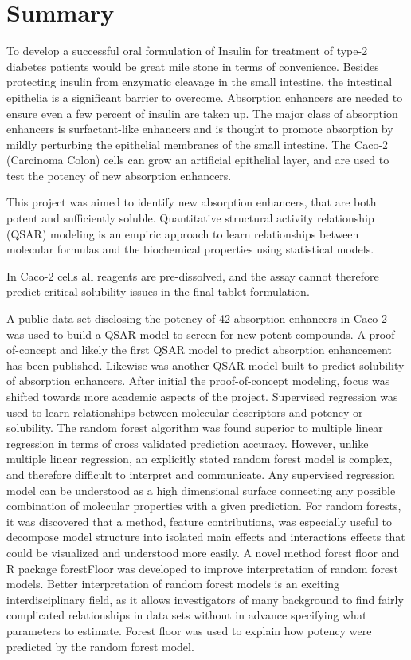 \chapter{Summary}
To develop a successful oral formulation of Insulin for treatment of type-2 diabetes patients would be great mile stone in terms of convenience. Besides protecting insulin from enzymatic cleavage in the small intestine, the intestinal epithelia is a significant barrier to overcome. Absorption enhancers are needed to ensure even a few percent of insulin are taken up. The major class of absorption enhancers is surfactant-like enhancers and is thought to promote absorption by mildly perturbing the epithelial membranes of the small intestine. The Caco-2 (Carcinoma Colon) cells can grow an artificial epithelial layer, and are used to test the potency of new absorption enhancers. 

This project was aimed to identify new absorption enhancers, that are both potent and sufficiently soluble. Quantitative structural activity relationship (QSAR) modeling is an empiric approach to learn relationships between molecular formulas and the biochemical properties using statistical models.

In Caco-2 cells all reagents are pre-dissolved, and the assay cannot therefore predict critical solubility issues in the final tablet formulation.

A public data set disclosing the potency of 42 absorption enhancers in Caco-2 was used to build a QSAR model to screen for new potent compounds. A proof-of-concept and likely the first QSAR model to predict absorption enhancement has been published. Likewise was another QSAR model built to predict solubility of absorption enhancers. After initial the proof-of-concept modeling, focus was shifted towards more academic aspects of the project. Supervised regression was used to learn relationships between molecular descriptors and potency or solubility. The random forest algorithm was found superior to multiple linear regression in terms of cross validated prediction accuracy. However, unlike multiple linear regression, an explicitly stated random forest model is complex, and therefore difficult to interpret and communicate. Any supervised regression model can be understood as a high dimensional surface connecting any possible combination of molecular properties with a given prediction. For random forests, it was discovered that a method, feature contributions, was especially useful to decompose model structure into isolated main effects and interactions effects that could be visualized and understood more easily. A novel method forest floor and R package forestFloor was developed to improve interpretation of random forest models. Better interpretation of random forest models is an exciting interdisciplinary field, as it allows investigators of many background to find fairly complicated relationships in data sets without in advance specifying what parameters to estimate. Forest floor was used to explain how potency were predicted by the random forest model.